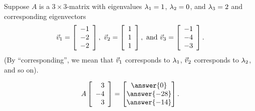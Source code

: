 \documentclass{ximera}
\author{Zack Reed}
\begin{document}
\begin{problem}
  Suppose $A$ is a $3\times 3$-matrix with eigenvalues
  $\eigenvar_1=1$, $\eigenvar_2=0$, and $\eigenvar_3=2$ and
  corresponding eigenvectors
  \begin{equation*}
    \vect{v}_1 = \startmat{r}
      -1 \\
      -2 \\
      -2
    \stopmat,
    \quad
    \vect{v}_2 = \startmat{r}
      1 \\
      1 \\
      1
    \stopmat,
    \quad\mbox{and}\quad
    \vect{v}_3 = \startmat{r}
      -1 \\
      -4 \\
      -3
    \stopmat.
  \end{equation*}
  (By ``corresponding'', we mean that $\vect{v}_1$ corresponds to
  $\eigenvar_1$, $\vect{v}_2$ corresponds to $\eigenvar_2$, and so
  on).


  \begin{equation*}
    A\startmat{r}
      3 \\
      -4 \\
      3
    \stopmat=\begin{bmatrix}
      \answer{0}\\
      \answer{-28}\\
      \answer{-14}
    \end{bmatrix}.
  \end{equation*}
\end{problem}
\end{document}
